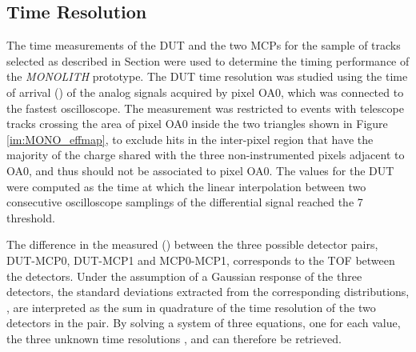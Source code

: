 		\subsection{Time Resolution}	

		The time measurements of the DUT and the two MCPs for the sample of tracks selected as described in Section  were used to determine the timing performance of the \textit{MONOLITH} prototype. 
		The DUT time resolution was studied using the time of arrival (\toa) of the  analog signals acquired by pixel OA0, which was connected to the fastest oscilloscope. The measurement was restricted to events with telescope tracks crossing the area of pixel OA0 inside the two triangles shown in Figure \ref{im:MONO_effmap}, to exclude hits in the inter-pixel region that have the majority of the charge shared with the three non-instrumented pixels adjacent to OA0, and thus should not be associated to pixel OA0. 
		The \toa values for the DUT were computed as the time at which the linear interpolation between two consecutive oscilloscope samplings of the differential signal reached the 7 \noise threshold. 
		
		The difference in the measured \toa (\dtoa) between the three possible detector pairs, DUT-MCP0, DUT-MCP1 and MCP0-MCP1, corresponds to the TOF between the detectors. Under the assumption of a Gaussian response of the three detectors, the standard deviations extracted from the corresponding \dtoa distributions, \sigdtoa, are interpreted as the sum in quadrature of the time resolution of the two detectors in the pair. By solving a system of three equations, one for each \sigdtoa value, the three unknown time resolutions \sigdut, \sigmcpzero and \sigmcpone can therefore be retrieved.

